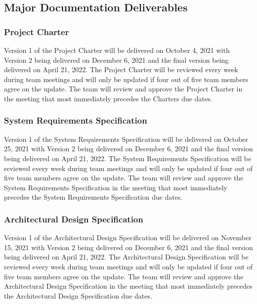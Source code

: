 
\subsection{Major Documentation Deliverables}
\subsubsection{Project Charter}
Version 1 of the Project Charter will be delivered on October 4, 2021 with Version 2 being delivered on December 6, 2021 and the final version being delivered on  April 21, 2022. The Project Charter will be reviewed every week during team meetings and will only be updated if four out of five team members agree on the update. The team will review and approve the Project Charter in the meeting that most immediately precedes the Charters due dates.

\subsubsection{System Requirements Specification}
Version 1 of the System Requirements Specification will be delivered on October 25, 2021 with Version 2 being delivered on December 6, 2021 and the final version being delivered on April 21, 2022. The System Requirements Specification will be reviewed every week during team meetings and will only be updated if four out of five team members agree on the update. The team will review and approve the System Requirements Specification in the meeting that most immediately precedes the System Requirements Specification due dates.

\subsubsection{Architectural Design Specification}
Version 1 of the Architectural Design Specification will be delivered on November 15, 2021 with Version 2 being delivered on December 6, 2021 and the final version being delivered on April 21, 2022. The Architectural Design Specification will be reviewed every week during team meetings and will only be updated if four out of five team members agree on the update. The team will review and approve the Architectural Design Specification in the meeting that most immediately precedes the Architectural Design Specification due dates.

